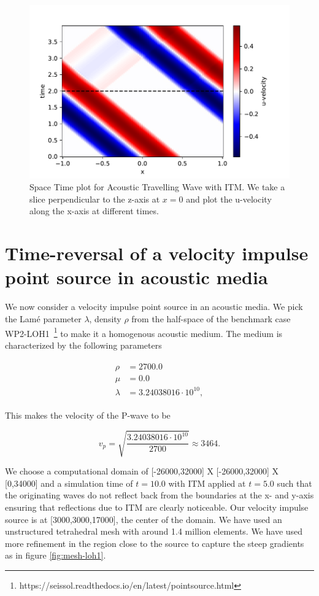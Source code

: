 \begin{figure}
    \centering
    \includegraphics[width=0.75\linewidth]{figures/space-time-plot-travelling.pdf}
    \caption{Space Time plot for Acoustic Travelling Wave with \ac{ITM}. We take a slice perpendicular to the z-axis at $x=0$ and plot the u-velocity along the x-axis at different times.}
    \label{fig:space-timeplot-travelling}
\end{figure}

\section{Time-reversal of a velocity impulse point source in acoustic media} \label{sec:acousticITM}

We now consider a velocity impulse point source in an acoustic media. We pick the Lam\'{e} parameter $\lambda$, density $\rho$ 
from the half-space of the benchmark case WP2-LOH1~\footnote[1]{https://seissol.readthedocs.io/en/latest/pointsource.html} to make it a homogenous acoustic medium. 
The medium is characterized by the following parameters

\begin{align}
    \begin{split}
        \rho &=    2700.0 \\
        \mu &=     0.0 \\
        \lambda &= 3.24038016 \cdot 10^{10},
    \end{split}
\end{align}

This makes the velocity of the P-wave to be

\begin{equation}
    v_p = \sqrt{\frac{3.24038016 \cdot 10^{10}}{2700}} \approx 3464 .
\end{equation}

We choose a computational domain of [-26000,32000] X [-26000,32000] X [0,34000] and a simulation time of $t=10.0$ with \ac{ITM} applied at $t=5.0$ 
such that the originating waves do not reflect back from the boundaries at the x- and y-axis ensuring that
reflections due to \ac{ITM} are clearly noticeable. 
Our velocity impulse source is at [3000,3000,17000], the center of the domain. 
We have used an unstructured tetrahedral mesh with around 1.4 million elements. We have used more refinement in the region close to the source to capture the steep gradients as in figure \ref{fig:mesh-loh1}.

